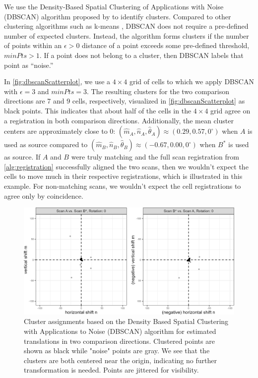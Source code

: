 \documentclass[reprint]{JASA}
\begin{document}
We use the Density-Based Spatial Clustering of Applications with Noise
(DBSCAN) algorithm proposed by \citet{Ester1996} to identify clusters.
Compared to other clustering algorithms such as k-means
\citep{MacQueen1967}, DBSCAN does not require a pre-defined number of
expected clusters. Instead, the algorithm forms clusters if the number
of points within an \(\epsilon > 0\) distance of a point exceeds some
pre-defined threshold, \(minPts > 1\). If a point does not belong to a
cluster, then DBSCAN labels that point as ``noise.''

In \autoref{fig:dbscanScatterplot}, we use a \(4 \times 4\) grid of
cells to which we apply DBSCAN with \(\epsilon = 3\) and \(minPts = 3\).
The resulting clusters for the two comparison directions are 7 and 9
cells, respectively, visualized in \autoref{fig:dbscanScatterplot} as
black points. This indicates that about half of the cells in the
\(4 \times 4\) grid agree on a registration in both comparison
directions. Additionally, the mean cluster centers are approximately
close to 0:
\((\hat{m}_A,\hat{n}_A,\hat{\theta}_A) \approx (0.29, 0.57, 0^\circ)\)
when \(A\) is used as source compared to
\((\hat{m}_B,\hat{n}_B,\hat{\theta}_B) \approx (-0.67, 0.00, 0^\circ)\)
when \(B^*\) is used as source. If \(A\) and \(B\) were truly matching
and the full scan registration from \autoref{alg:registration}
successfully aligned the two scans, then we wouldn't expect the cells to
move much in their respective registrations, which is illustrated in
this example. For non-matching scans, we wouldn't expect the cell
registrations to agree only by coincidence.

\begin{figure}[htbp]
\includegraphics[width=.5\textwidth]{figures/dbscanScatterplot} \caption{\label{fig:dbscanScatterplot} Cluster assignments based on the Density Based Spatial Clustering with Applications to Noise (DBSCAN) algorithm for estimated translations in two comparison directions. Clustered points are shown as black while "noise" points are gray. We see that the clusters are both centered near the origin, indicating no further transformation is needed. Points are jittered for visibility.}\label{fig:unnamed-chunk-7}
\end{figure}
\end{document}
